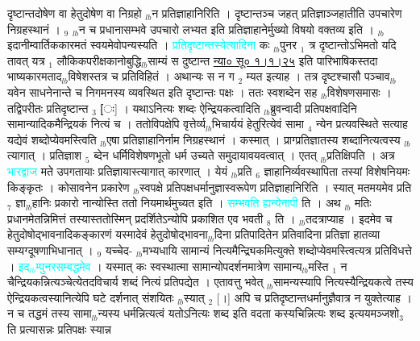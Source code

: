 \documentclass[article,12pt,a4paper]{memoir}%
\newcommand{\quotelemma}[1]{\textcolor{cyan}{#1}}
\begin{document}
दृष्टान्तदोषेण वा हेतुदोषेण वा निग्रहो {\tiny $_{lb}$}न प्रतिज्ञाहानिरिति । दृष्टान्तञ्च जहत् प्रतिज्ञाञ्जहातीति उपचारेण निग्रहस्थानं । {\tiny $_{9}$} \leavevmode{} {\tiny $_{lb}$}न च प्रधानासम्भवे उपचारो लभ्यत इति प्रतिज्ञाहानेर्मुख्यो विषयो वक्तव्य इति । {\tiny $_{lb}$}इदानीम्वार्तिककारमतं स्वयमेवोपन्यस्यति । \quotelemma{प्रतिदृष्टान्तस्येत्यादिना} \cite[8b6]{vn-msN} कः {\tiny $_{lb}$}पुनर {\tiny $_{1}$} त्र दृष्टान्तोऽभिमतो यदि तावत् यत्र {\tiny $_{1}$} लौकिकपरीक्षकानोबुद्धि{\tiny $_{lb}$}साम्यं स दुष्टान्त \href{http://sarit.indology.info/?cref=ns\%C5\%AB.1.1.25}{न्या० सू० १।१।२५} इति पारिभाषिकस्तदा भाष्यकारमताद{\tiny $_{lb}$}विषेशस्तत्र च प्रतिविहितं । अथान्यः स न ग {\tiny $_{2}$} म्यत इत्याह । तत्र दृष्टश्चासौ पञ्चाव{\tiny $_{lb}$}यवेन साधनेनान्ते च निगमनस्य व्यवस्थित इति दृष्टान्तः पक्षः । ततः स्वशब्देन सह {\tiny $_{lb}$}विशेषणसमासः । तद्विपरीतः प्रतिदृष्टान्त {\tiny $_{3}$} [ः] । यथाऽनित्यः शब्दः ऐन्द्रियकत्वादिति {\tiny $_{lb}$}ब्रुवन्वादी प्रतिपक्षवादिनि सामान्यादिकमैन्द्रियकं नित्यं च । ततोविपक्षेपि वृत्तेर्व्य{\tiny $_{lb}$}भिचार्ययं हेतुरित्येवं सामा {\tiny $_{4}$} न्येन प्रत्यवस्थिते सत्याह यद्येवं शब्दोप्येवमस्त्विति {\tiny $_{lb}$}एषा प्रतिज्ञाहानिर्नाम निग्रहस्थानं । कस्मात् । प्राग्प्रतिज्ञातस्य शब्दानित्यत्वस्य {\tiny $_{lb}$}त्यागात् । प्रतिज्ञाश {\tiny $_{5}$} ब्देन धर्मिविशेषणभूतो धर्म उच्यते समुदायावयवत्वात् । एतत् {\tiny $_{lb}$}प्रतिक्षिपति । अत्र \quotelemma{भारद्वाज} मते उपगतायाः प्रतिज्ञायास्त्यागात् कारणात् । येयं {\tiny $_{lb}$}प्रति {\tiny $_{6}$} ज्ञाहानिर्व्यवस्थापिता तस्यां विशेषनियमः किङ्कृतः । कोसावनेन प्रकारेण {\tiny $_{lb}$}स्वपक्षे प्रतिपक्षधर्मानुज्ञास्वरूपेण प्रतिज्ञाहानिरिति । स्यात् मतमयमेव प्रति {\tiny $_{7}$} ज्ञा{\tiny $_{lb}$}हानिः प्रकारो नान्योस्ति ततो नियमार्थमुच्यत इति । \quotelemma{सम्भवति ह्यन्येनापी} ति । अथ {\tiny $_{lb}$} \leavevmode{} मतिः प्रधानमेतन्निमित्तं तस्यास्ततोस्मिन् प्रदर्शितेऽन्योपि प्रकाशित एव भवती {\tiny $_{8}$} ति । {\tiny $_{lb}$}तदत्राप्याह । इदमेव च हेतुदोषोद्भावनादिकङ्कारणं यस्मादेवं हेतुदोषोद्भावना{\tiny $_{lb}$}दिना प्रतिपादितेन प्रतिवादिना प्रतिज्ञा हातव्या सम्यग्दूषणाभिधानात् । {\tiny $_{9}$} \leavevmode{} यच्चेद- {\tiny $_{lb}$}मभ्यधायि सामान्यं नित्यमैन्द्र्यिकमित्युक्ते शब्दोप्येवमस्त्वित्यत्र प्रतिविधत्ते । \quotelemma{इद{\tiny $_{lb}$}म्पुनरसम्बद्धमेव} \cite[9a1]{vn-msN} । यस्मात् कः स्वस्थात्मा सामान्योपदर्शनमात्रेण सामान्य{\tiny $_{lb}$}मस्ति {\tiny $_{1}$} न चैन्द्रियकन्नित्यञ्चेत्येतदविचार्य शब्दं नित्यं प्रतिपद्येत । एतावत्तु भवेत् {\tiny $_{lb}$}सामन्यस्यापि नित्यस्यैन्द्रियकत्वे तस्य ऐन्द्रियकत्वस्यानित्येपि घटे दर्शनात् संशयितः {\tiny $_{lb}$}स्यात् {\tiny $_{2}$} [।] अपि च प्रतिदृष्टान्तधर्मानुज्ञैवात्र न युक्तेत्याह । न च तद्धमं तस्य सामा{\tiny $_{lb}$}न्यस्य धर्मन्नित्यत्वं यतोऽनित्यः शब्द इति वदता कस्यचिन्नित्यः शब्द इत्ययमञ्जशो{\tiny $_{3}$} ति प्रत्यासन्नः प्रतिपक्षः स्यान्न 
\end{document}
